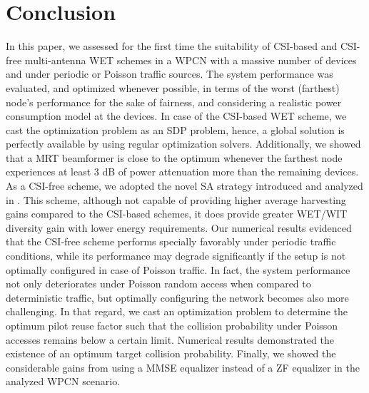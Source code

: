 \documentclass[10pt,journal,a4paper]{IEEEtran}
\begin{document}
	\section{Conclusion}\label{conclusions}
	In this paper, we assessed for the first time the suitability of CSI-based and CSI-free multi-antenna WET schemes in a WPCN with a massive number of devices and under periodic or Poisson traffic sources. The system performance was evaluated, and optimized whenever possible, in terms of the worst (farthest) node's performance for the sake of fairness, and considering a realistic power consumption model at the devices. In case of the CSI-based WET scheme, we cast the optimization problem as an SDP problem, hence, a global solution is perfectly available by using regular optimization solvers. Additionally, we showed that a MRT beamformer is close to the optimum whenever the farthest node experiences at least 3 dB of power attenuation more than the remaining devices. As a CSI-free scheme, we adopted the novel $\mathrm{SA}$ strategy introduced and analyzed in \cite{Lopez.2019_CSI,Lopez.2020}. This scheme, although not capable of providing higher average harvesting gains compared to the CSI-based schemes, it does provide greater WET/WIT  diversity gain with lower energy requirements. Our numerical results evidenced that the CSI-free scheme performs specially favorably under periodic traffic conditions, while its performance may degrade significantly if the setup is not optimally configured in case of Poisson traffic. In fact, the system performance not only deteriorates under Poisson random access when compared to deterministic traffic, but  optimally configuring the network becomes also more challenging.
	In that regard, we cast an optimization problem to determine the optimum pilot reuse factor such that the collision probability under Poisson accesses remains below a certain limit. Numerical results demonstrated the existence of an optimum target collision  probability. 
	Finally, we showed the considerable gains from using a MMSE equalizer instead of a ZF equalizer in the analyzed WPCN scenario.
%
	\appendices
%
\end{document}

